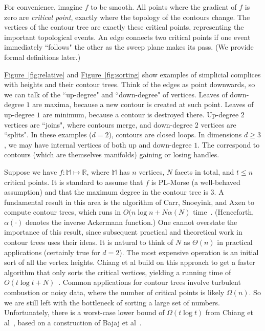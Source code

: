 \documentclass[11pt]{article}
\theoremstyle{definition}
\newcommand{\MM}{\mathbb{M}}
\newcommand{\RR}{\mathbb{R}}
\newcommand{\Fig}[1]{\hyperref[fig:#1]{Figure~\ref*{fig:#1}}} %
\begin{document}
For convenience, imagine $f$ to be smooth. All points where the gradient of $f$ is zero are \emph{critical point},
exactly where the topology of the contours change. The vertices of the contour tree are exactly these critical points,
representing the important topological events. An edge connects two critical points if one event immediately ``follows"
the other as the sweep plane makes its pass. (We provide formal definitions later.) 

\Fig{relative} and \Fig{sorting} show examples of simplicial complices with heights and their contour trees.
Think of the edges as point downwards, so we can talk of the ``up-degree" and ``down-degree" of vertices.
Leaves of down-degree $1$ are maxima, because a new contour is created at such point. Leaves of up-degree
$1$ are minimum, because a contour is destroyed there. Up-degree $2$ vertices are ``joins", where contours
merge, and down-degree $2$ vertices are ``splits". In these examples ($d=2$), contours are closed loops.
In dimensions $d \geq 3$, we may have internal
vertices of both up and down-degree $1$. The correspond to contours (which are themselves manifolds) gaining or losing handles.

Suppose we have $f: \MM \mapsto \RR$, where $\MM$ has $n$ vertices, $N$ facets in total, and $t \leq n$ critical points.
It is standard to assume that $f$ is PL-Morse (a well-behaved assumption) and that the maximum degree in the contour tree
is $3$. A fundamental result in this area is the algorithm of Carr, Snoeyink, and Axen to compute contour trees,
which runs in $O(n\log n + N\alpha(N)$ time~\cite{csa-cctad-00}. (Henceforth, $\alpha(\cdot)$ denotes the inverse
Ackermann function.) One cannot overstate the importance of this result, since 
subsequent practical and theoretical work in contour trees uses their ideas. It is natural to think of $N$ as $\Theta(n)$
in practical applications (certainly true for $d=2$). The most expensive operation is an initial sort of all the vertex
heights. Chiang et al build on this approach to get a faster algorithm that only sorts the critical vertices,
yielding a running time of $O(t\log t + N)$~\cite{cllr-sooscctmp-05}.
Common applications for contour trees involve turbulent combustion or noisy data, where the number of critical points is likely $\Omega(n)$.
So we are still left with the bottleneck of sorting a large set of numbers. Unfortunately, there is a worst-case
lower bound of $\Omega(t\log t)$ from Chiang et al~\cite{cllr-sooscctmp-05}, based on a construction of Bajaj et al~\cite{BaKr+98}.
\end{document}
